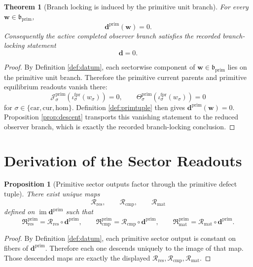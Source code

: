 \documentclass[11pt]{article}
\newcommand{\DefectTuple}{\mathbf d}
\newcommand{\PrimDefectTuple}{\mathbf d^{\mathrm{prim}}}
\newcommand{\ResidualRead}{\mathscr R_{\mathrm{res}}}
\newcommand{\CompletionRead}{\mathscr R_{\mathrm{cmp}}}
\newcommand{\MatterRead}{\mathscr R_{\mathrm{mat}}}
\newcommand{\PrimBranch}{\mathfrak b_{\mathrm{prim}}}
\newcommand{\Car}{\mathrm{car}}
\newcommand{\Cur}{\mathrm{cur}}
\newcommand{\Hom}{\mathrm{hom}}
\newcommand{\ForPrimInc}[1]{\iota_{#1}^{\mathrm{fpr}}}
\newcommand{\PrimCurrent}[1]{\mathcal J_{#1}^{\mathrm{prim}}}
\newcommand{\PrimTheta}[1]{\Theta_{#1}^{\mathrm{prim}}}
\newcommand{\PrimResidualSector}{\mathfrak R_{\mathrm{res}}^{\mathrm{prim}}}
\newcommand{\PrimCompletionSector}{\mathfrak R_{\mathrm{cmp}}^{\mathrm{prim}}}
\newcommand{\PrimMatterSector}{\mathfrak R_{\mathrm{mat}}^{\mathrm{prim}}}
\newtheorem{proposition}{Proposition}
\newtheorem{theorem}{Theorem}
\begin{document}
\begin{theorem}[Branch locking is induced by the primitive unit branch]
\label{thm:locking}
For every \(\mathbf w\in\PrimBranch\),
\[
\PrimDefectTuple(\mathbf w)=0.
\]
Consequently the active completed observer branch satisfies the recorded branch-locking statement
\[
\DefectTuple=0.
\]
\end{theorem}

\begin{proof}
By Definition \ref{def:datum}, each sectorwise component of \(\mathbf w\in\PrimBranch\) lies on the primitive unit branch. Therefore the primitive current parents and primitive equilibrium readouts vanish there:
\[
\PrimCurrent{\sigma}(\ForPrimInc{\sigma}(w_{\sigma}))=0,
\qquad
\PrimTheta{\sigma}(\ForPrimInc{\sigma}(w_{\sigma}))=0
\]
for \(\sigma\in\{\Car,\Cur,\Hom\}\). Definition \ref{def:primtuple} then gives \(\PrimDefectTuple(\mathbf w)=0\). Proposition \ref{prop:descent} transports this vanishing statement to the reduced observer branch, which is exactly the recorded branch-locking conclusion.
\end{proof}

\section{Derivation of the Sector Readouts}

\begin{proposition}[Primitive sector outputs factor through the primitive defect tuple]
\label{prop:factor}
There exist unique maps
\[
\ResidualRead,\qquad
\CompletionRead,\qquad
\MatterRead
\]
defined on \(\operatorname{im}\PrimDefectTuple\) such that
\begin{equation}
\PrimResidualSector=\ResidualRead\circ\PrimDefectTuple,\qquad
\PrimCompletionSector=\CompletionRead\circ\PrimDefectTuple,\qquad
\PrimMatterSector=\MatterRead\circ\PrimDefectTuple.
\label{eq:factor_prim}
\end{equation}
\end{proposition}

\begin{proof}
By Definition \ref{def:datum}, each primitive sector output is constant on fibers of \(\PrimDefectTuple\). Therefore each one descends uniquely to the image of that map. Those descended maps are exactly the displayed \(\ResidualRead,\CompletionRead,\MatterRead\).
\end{proof}
\end{document}
